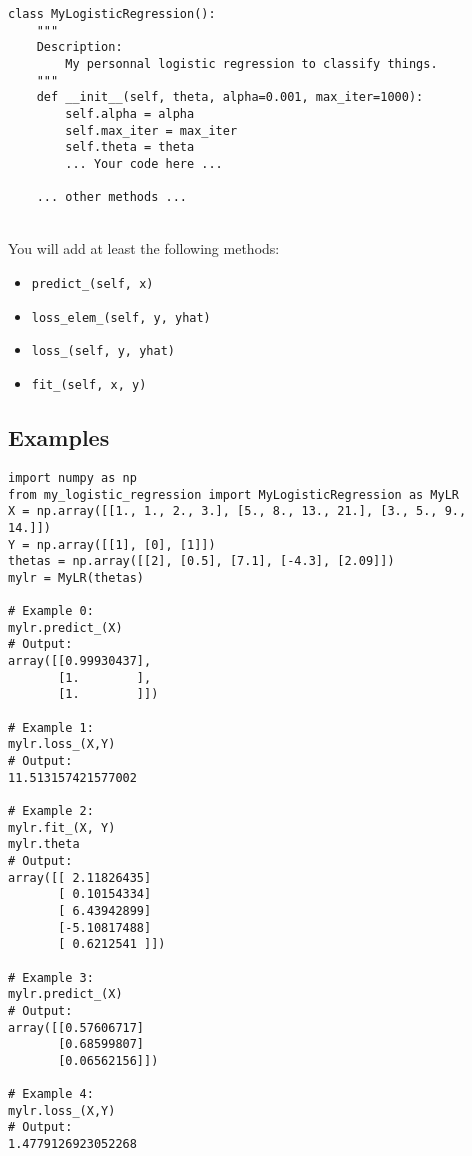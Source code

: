 \begin{verbatim}
class MyLogisticRegression():
	"""
	Description:
		My personnal logistic regression to classify things.
	"""
    def __init__(self, theta, alpha=0.001, max_iter=1000):
        self.alpha = alpha
        self.max_iter = max_iter
        self.theta = theta
        ... Your code here ...

	... other methods ...
\end{verbatim}
\\
You will add at least the following methods:
\begin{itemize}
  \item \texttt{predict\_(self, x)}
  \item \texttt{loss\_elem\_(self, y, yhat)}
  \item \texttt{loss\_(self, y, yhat)}
  \item \texttt{fit\_(self, x, y)}
\end{itemize}

\subsection*{Examples}

\begin{verbatim}
import numpy as np
from my_logistic_regression import MyLogisticRegression as MyLR
X = np.array([[1., 1., 2., 3.], [5., 8., 13., 21.], [3., 5., 9., 14.]])
Y = np.array([[1], [0], [1]])
thetas = np.array([[2], [0.5], [7.1], [-4.3], [2.09]])
mylr = MyLR(thetas)

# Example 0:
mylr.predict_(X)
# Output:
array([[0.99930437],
       [1.        ],
       [1.        ]])

# Example 1:
mylr.loss_(X,Y)
# Output:
11.513157421577002

# Example 2:
mylr.fit_(X, Y)
mylr.theta
# Output:
array([[ 2.11826435]
       [ 0.10154334]
       [ 6.43942899]
       [-5.10817488]
       [ 0.6212541 ]])

# Example 3:
mylr.predict_(X)
# Output:
array([[0.57606717]
       [0.68599807]
       [0.06562156]])

# Example 4:
mylr.loss_(X,Y)
# Output:
1.4779126923052268
\end{verbatim}
